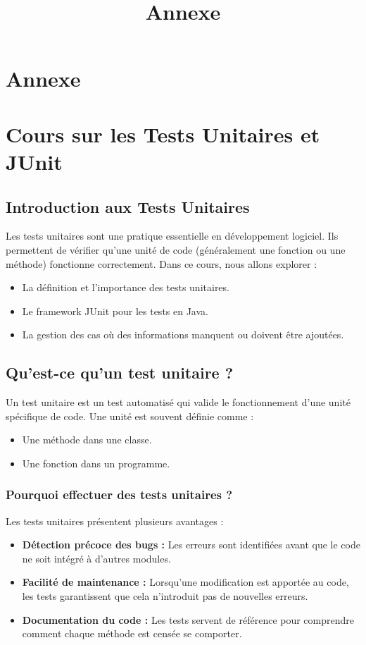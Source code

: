 \documentclass[12pt,a4paper]{article}
\title{Annexe}
\author{}
\date{}
\begin{document}
\maketitle

\tableofcontents

\newpage

\section*{Annexe}

\section{Cours sur les Tests Unitaires et JUnit}
\subsection{Introduction aux Tests Unitaires}
Les tests unitaires sont une pratique essentielle en développement logiciel. Ils permettent de vérifier qu'une unité de code (généralement une fonction ou une méthode) fonctionne correctement. Dans ce cours, nous allons explorer :
\begin{itemize}
    \item La définition et l'importance des tests unitaires.
    \item Le framework JUnit pour les tests en Java.
    \item La gestion des cas où des informations manquent ou doivent être ajoutées.
\end{itemize}

\subsection{Qu'est-ce qu'un test unitaire ?}
Un test unitaire est un test automatisé qui valide le fonctionnement d'une unité spécifique de code. Une unité est souvent définie comme :
\begin{itemize}
    \item Une méthode dans une classe.
    \item Une fonction dans un programme.
\end{itemize}

\subsubsection{Pourquoi effectuer des tests unitaires ?}
Les tests unitaires présentent plusieurs avantages :
\begin{itemize}
    \item \textbf{Détection précoce des bugs :} Les erreurs sont identifiées avant que le code ne soit intégré à d'autres modules.
    \item \textbf{Facilité de maintenance :} Lorsqu'une modification est apportée au code, les tests garantissent que cela n'introduit pas de nouvelles erreurs.
    \item \textbf{Documentation du code :} Les tests servent de référence pour comprendre comment chaque méthode est censée se comporter.
\end{itemize}
\end{document}
